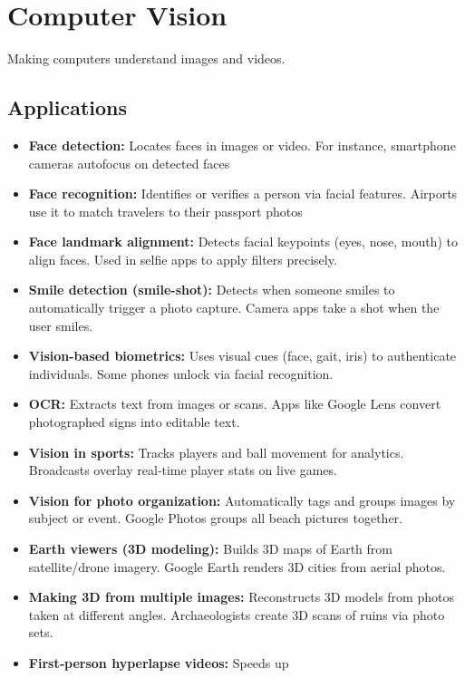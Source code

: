 \section*{Computer Vision}

Making computers understand images and videos.

\subsection*{Applications}

\begin{itemize}
  \item \textbf{Face detection:} Locates faces in images or video.
    For instance, smartphone cameras autofocus on detected faces
    
  \item \textbf{Face recognition:} Identifies or verifies a person
    via facial features. Airports use it to match travelers to their
    passport photos
  \item \textbf{Face landmark alignment:} Detects facial keypoints
    (eyes, nose, mouth) to align faces. Used in selfie apps to apply
    filters precisely.
  \item \textbf{Smile detection (smile-shot):} Detects when someone
    smiles to automatically trigger a photo capture. Camera apps take
    a shot when the user smiles.
  \item \textbf{Vision-based biometrics:} Uses visual cues (face,
    gait, iris) to authenticate individuals. Some phones unlock via
    facial recognition.
  \item \textbf{OCR:} Extracts text from images or scans. Apps like
    Google Lens convert photographed signs into editable text.
  \item \textbf{Vision in sports:} Tracks players and ball movement
    for analytics. Broadcasts overlay real‑time player stats on live games.
  \item \textbf{Vision for photo organization:} Automatically tags
    and groups images by subject or event. Google Photos groups all
    beach pictures together.
  \item \textbf{Earth viewers (3D modeling):} Builds 3D maps of Earth
    from satellite/drone imagery. Google Earth renders 3D cities from
    aerial photos.
  \item \textbf{Making 3D from multiple images:} Reconstructs 3D
    models from photos taken at different angles. Archaeologists
    create 3D scans of ruins via photo sets.
  \item \textbf{First‑person hyperlapse videos:} Speeds up

\end{itemize}
